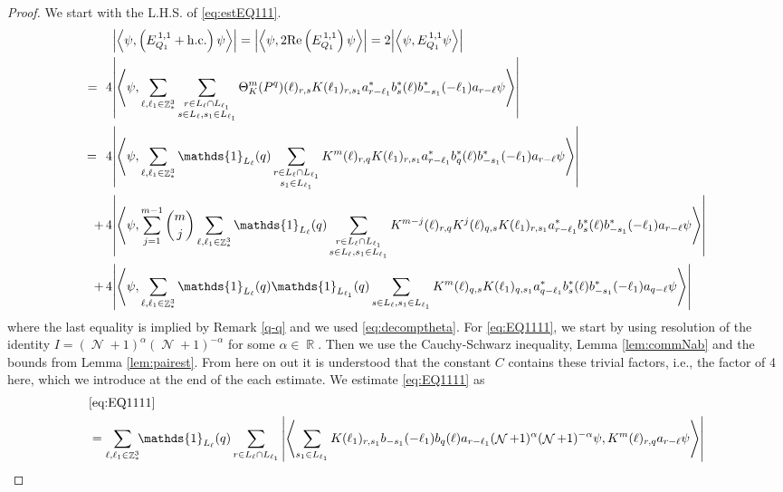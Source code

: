 \documentclass[sn-mathphys, Numbered ,a4paper]{sn-jnl}%
\DeclareMathOperator{\R}{\mathbb{R}}
\DeclareMathOperator{\Z}{\mathbb{Z}}
\DeclareMathOperator{\NN}{\mathcal{N}}
\newcommand{\eva}[1]{\left\langle #1 \right\rangle}
\theoremstyle{plain}
\theoremstyle{definition}
\theoremstyle{remark}
\theoremstyle{plain}
\theoremstyle{definition}
\theoremstyle{remark}
\begin{document}
\begin{proof}We start with the L.H.S. of \eqref{eq:estEQ111}.
\begin{align}
	&\abs{\eva{\psi,\left(E^{\,1,1}_{Q_1}+\mathrm{h.c.}\right) \psi }} = \abs{\eva{\psi,2\mathrm{Re}\left(E^{\,1,1}_{Q_1}\right) \psi }} = 2\abs{\eva{\psi, E^{\,1,1}_{Q_1} \psi }}\nonumber\\
	=\,\:4&\abs{\eva{\psi, \sum\limits_{\ell, \ell_1\in \Z^3_*}\sum\limits_{\substack{r\in L_{\ell} \cap L_{\ell_1}\\  s \in L_{\ell}, s_1\in L_{\ell_1}}} \Theta^m_{K}(P^q)(\ell)_{r,s} K(\ell_1)_{r,s_1} a^*_{r-\ell_1} b^*_{s}(\ell) b^*_{-s_1}(-\ell_1) a_{r-\ell} \psi }} \nonumber\\
	=\,\;4& \abs{\eva{\psi,\sum\limits_{\ell, \ell_1\in \Z^3_*} \mathds{1}_{L_{\ell}}(q) \sum\limits_{\substack{r\in L_{\ell} \cap L_{\ell_1}\\s_1\in L_{\ell_1}}} K^m(\ell )_{r,q} K(\ell_1)_{r,s_1} a^*_{r-\ell_1} b^*_{q}(\ell) b^*_{-s_1}(-\ell_1) a_{r-\ell} \psi }}\label{eq:EQ1111}\\
	+\,4&   \abs{\eva{\psi, \sum\limits_{j=1}^{m-1} {{m}\choose j} \sum\limits_{\ell, \ell_1\in \Z^3_*}\mathds{1}_{L_{\ell}}(q) \sum\limits_{\substack{r\in L_{\ell} \cap L_{\ell_1}\\ s \in L_{\ell},s_1\in L_{\ell_1}}} K^{m-j}(\ell)_{r,q} K^{j}(\ell)_{q,s} K(\ell_1)_{r,s_1} a^*_{r-\ell_1} b^*_{s}(\ell) b^*_{-s_1}(-\ell_1) a_{r-\ell} \psi }}\label{eq:EQ1112}\\
	+\,4& \abs{\eva{\psi, \sum\limits_{\ell, \ell_1\in \Z^3_*} \mathds{1}_{L_{\ell}}(q) \mathds{1}_{L_{\ell_1}}(q) \sum\limits_{s \in L_{\ell},s_1\in L_{\ell_1}} K^m(\ell)_{q,s}K(\ell_1)_{q,s_1}
	a^*_{q-\ell_1}b^*_{s}(\ell) b^*_{-s_1}(-\ell_1)a_{q-\ell} \psi }}\label{eq:EQ1113}
\end{align}
where the last equality is implied by Remark \ref{q-q} and we used \eqref{eq:decomptheta}.
For \eqref{eq:EQ1111}, we start by using resolution of the identity $I = (\NN+1)^{\alpha}(\NN+1)^{-\alpha}$ for some $\alpha \in \R$. Then we use the Cauchy-Schwarz inequality, Lemma \ref{lem:commNab} and the bounds from Lemma \ref{lem:pairest}.  From here on out it is understood that the constant $C$ contains these trivial factors, i.e., the factor of 4 here, which we introduce at the end of the each estimate. We estimate \eqref{eq:EQ1111} as 
\begin{align}
	&\eqref{eq:EQ1111}\nonumber\\
    &= \sum\limits_{\ell,\ell_1  \in \Z^3_*}\!\! \mathds{1}_{L_\ell}(q) \sum\limits_{r \in L_\ell \cap L_{\ell_1}} \abs{\eva{ \sum\limits_{s_1 \in L_{\ell_1}} K(\ell_1)_{r,s_1} b_{-s_1}(-\ell_1) b_{q}(\ell) a_{r-\ell_1} (\NN+1)^{\alpha} (\NN+1)^{-\alpha} \psi,  K^{m}(\ell)_{r,q} a_{r-\ell} \psi }}\nonumber\\

\end{align}
\end{proof}
\end{document}
